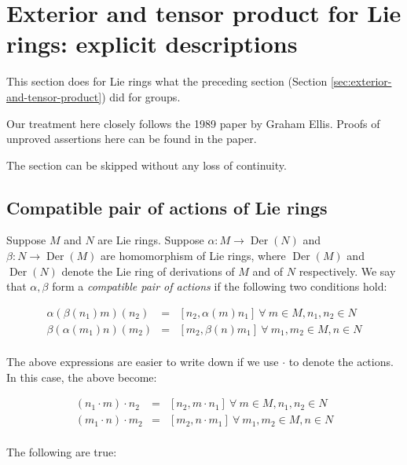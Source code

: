 \documentclass{ucetd}
\begin{document}
\section{Exterior and tensor product for Lie rings: explicit descriptions}\label{sec:exterior-and-tensor-product-lie}

This section does for Lie rings what the preceding section (Section
\ref{sec:exterior-and-tensor-product}) did for groups.

Our treatment here closely follows the 1989 paper \cite{EllisLie} by
Graham Ellis. Proofs of unproved assertions here can be found in the
paper.

The section can be skipped without any loss of continuity.

\subsection{Compatible pair of actions of Lie rings}

Suppose $M$ and $N$ are Lie rings. Suppose $\alpha:M \to
\operatorname{Der}(N)$ and $\beta:N \to \operatorname{Der}(M)$ are
homomorphism of Lie rings, where
$\operatorname{Der}(M)$ and $\operatorname{Der}(N)$ denote the Lie
ring of derivations of $M$ and of $N$ respectively. We say that
$\alpha,\beta$ form a {\em compatible pair of actions} if the
following two conditions hold:

\begin{eqnarray*}
  \alpha(\beta(n_1)m)(n_2) & = & [n_2,\alpha(m)n_1] \ \forall \ m \in M, n_1,n_2 \in N\\
  \beta(\alpha(m_1)n)(m_2) & = & [m_2,\beta(n)m_1] \ \forall \ m_1,m_2 \in M, n \in N\\
\end{eqnarray*}

The above expressions are easier to write down if we use $\cdot$ to denote the actions. In this case, the above become:

\begin{eqnarray*}
  (n_1 \cdot m) \cdot n_2 & = & [n_2,m \cdot n_1] \ \forall \ m \in M, n_1,n_2 \in N\\
  (m_1 \cdot n) \cdot m_2 & = & [m_2, n \cdot m_1] \ \forall \ m_1,m_2 \in M, n \in N \\
\end{eqnarray*}

The following are true:
\end{document}
